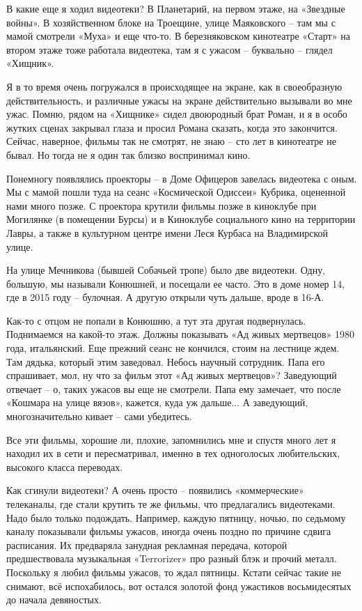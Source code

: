 В какие еще я ходил видеотеки? В Планетарий, на первом этаже, на «Звездные войны». В хозяйственном блоке на Троещине, улице Маяковского – там мы с мамой смотрели «Муха» и еще что-то. В березняковском кинотеатре «Старт» на втором этаже тоже работала видеотека, там я с ужасом – буквально – глядел «Хищник». 

Я в то время очень погружался в происходящее на экране, как в своеобразную действительность, и различные ужасы на экране действительно вызывали во мне ужас. Помню, рядом на «Хищнике» сидел двоюродный брат Роман, и я в особо жутких сценах закрывал глаза и просил Романа сказать, когда это закончится. Сейчас, наверное, фильмы так не смотрят, не знаю – сто лет в кинотеатре не бывал. Но тогда не я один так близко воспринимал кино.

Понемногу появлялись проекторы – в Доме Офицеров завелась видеотека с оным. Мы с мамой пошли туда на сеанс «Космической Одиссеи» Кубрика, оцененной нами много позже. С проектора крутили фильмы позже в киноклубе при Могилянке (в помещении Бурсы) и в Киноклубе социального кино на территории Лавры, а также в культурном центре имени Леся Курбаса на Владимирской улице.

На улице Мечникова (бывшей Собачьей тропе) было две видеотеки. Одну, большую, мы называли Конюшней, и посещали ее часто. Это в доме номер 14, где в 2015 году – булочная. А другую открыли чуть дальше, вроде в 16-А.

Как-то с отцом не попали в Конюшню, а тут эта другая подвернулась. Поднимаемся на какой-то этаж. Должны показывать «Ад живых мертвецов» 1980 года, итальянский. Еще прежний сеанс не кончился, стоим на лестнице ждем. Там дядька, который этим заведовал. Небось научный сотрудник. Папа его спрашивает, мол, ну что за фильм этот «Ад живых мертвецов»? Заведующий отвечает – о, таких ужасов вы еще не смотрели. Папа ему замечает, что после «Кошмара на улице вязов», кажется, куда уж дальше... А заведующий, многозначительно кивает – сами убедитесь.

Все эти фильмы, хорошие ли, плохие, запомнились мне и спустя много лет я находил их в сети и пересматривал, именно в тех одноголосых любительских, высокого класса переводах.

Как сгинули видеотеки? А очень просто – появились «коммерческие» телеканалы, где стали крутить те же фильмы, что предлагались видеотеками. Надо было только подождать. Например, каждую пятницу, ночью, по седьмому каналу показывали фильмы ужасов, иногда очень поздно по причине сдвига расписания. Их предваряла занудная рекламная передача, которой предшествовала музыкальная «Terrorizer» про разный блэк и прочий металл. Поскольку я любил фильмы ужасов, то ждал пятницы. Кстати сейчас такие не снимают, всё испохабилось, вот остался золотой фонд ужастиков восьмидесятых до начала девяностых.

